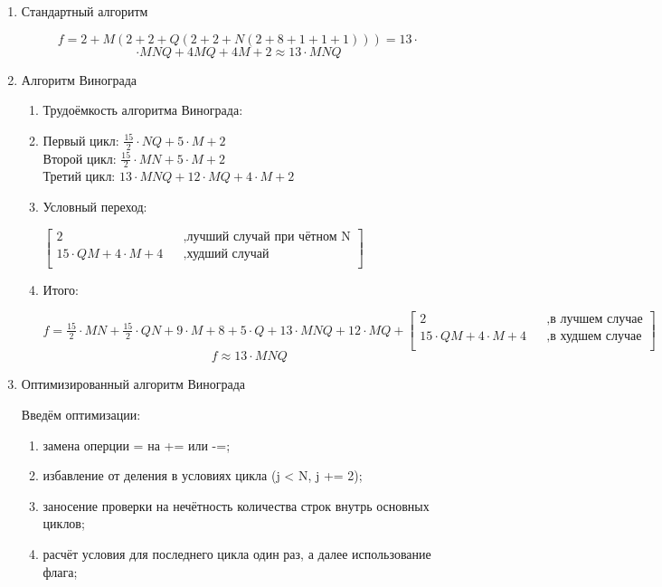 \begin{enumerate}
	\item Стандартный алгоритм
	
	$$f=2+M(2+2+Q(2+2+N(2+8+1+1+1)))=13 \cdot$$
	$$\cdot MNQ+4MQ+4M+2 \approx 13 \cdot MNQ$$ 
		
    \item Алгоритм Винограда
        \begin{enumerate}
            \item Трудоёмкость алгоритма Винограда:\\
            \item Первый цикл: $\frac{15}{2} \cdot N  Q + 5 \cdot M + 2$ \\
            Второй цикл: $\frac{15}{2} \cdot M  N + 5 \cdot M + 2$\\
            Третий цикл: $13 \cdot M  N Q + 12 \cdot M Q + 4 \cdot M + 2$\\
            \item Условный переход:
            
            $\begin{bmatrix}
            2    &&, \text{лучший случай при чётном N}\\
            15 \cdot QM + 4 \cdot M + 4 &&, \text{худший случай}\\
            \end{bmatrix} $ \\
            \item Итого:
            
            $f = \frac{15}{2} \cdot M  N + \frac{15}{2} \cdot Q  N + 9 \cdot M + 8 +  5 \cdot Q + 13 \cdot M  N Q + 12 \cdot M Q +
            \begin{bmatrix}
            2    &&, \text{в лучшем случае}\\
            15 \cdot QM + 4 \cdot M + 4 &&, \text{в худшем случае}\\
            \end{bmatrix} $ \\
            $$f \approx 13 \cdot MNQ $$
        \end{enumerate}

    \item Оптимизированный алгоритм Винограда

        Введём оптимизации:
		\begin{enumerate}
		    \item замена оперции = на += или -=;
		    \item избавление от деления в условиях цикла (j < N, j += 2);
			\item заносение проверки на нечётность количества строк внутрь основных циклов;
			\item расчёт условия для последнего цикла один раз, а далее использование флага;
		\end{enumerate}
			

\end{enumerate}
